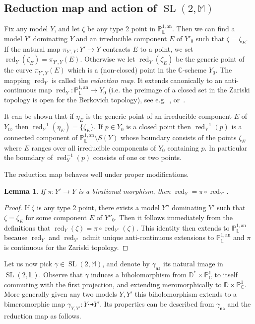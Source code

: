 \documentclass[11pt]{article}
\newtheorem{lemm}[theo]{Lemma}
\theoremstyle{definition}
\numberwithin{equation}{section}
\numberwithin{figure}{section}
\numberwithin{table}{section}
\DeclareMathOperator{\red}{red}
\DeclareMathOperator{\SL}{SL}
\newcommand{\cc}{\mathbb{C}}
\newcommand{\dD}{\mathbb{D}}
\newcommand{\mm}{\mathbb{M}}
\newcommand{\an}{\mathrm{an}}
\newcommand{\PP}{\mathbb{P}}
\newcommand{\berkl}{\mathbb P^{1,\an}_{\Laurent}}
\newcommand{\Laurent}{\mathbb{L}}
\newcommand{\na}{\mathsf{na}}
\begin{document}
\subsection{Reduction map and action of \texorpdfstring{$ \SL(2,\mm)$}{SL(2, mm)}}\label{subs:reduction}

Fix any model $Y$, and let $\zeta$ be any type 2 point in $\PP^{1,\an}_{\Laurent}$. Then we can find a model $Y'$ dominating $Y$ and an irreducible component $E$ of $Y'_0$ such that $\zeta = \zeta_E$. If the natural map $\pi_{Y',Y}: Y' \to Y$ contracts $E$ to a point, we set $\red_Y(\zeta_E) = \pi_{Y',Y}(E)$. Otherwise we let $\red_Y(\zeta_E)$ be the generic point of the curve $\pi_{Y',Y}(E)$ which is a (non-closed) point in the $\cc$-scheme $Y_0$. The mapping $\red_Y$ is called the \emph{reduction map}. It extends canonically to an anti-continuous map $\red_Y: \PP^{1,\an}_{\Laurent}\to Y_0$ (i.e. the preimage of a closed set in the Zariski topology is open for the Berkovich topology), see e.g.~\cite[\S 5.2.4]{temkin}, or~\cite[\S 4.2]{demarco-faber-2}.

It can be shown that if $\eta_E$ is the generic point of an irreducible component $E$ of $Y_0$, then $\red_Y^{-1}(\eta_E) = \{ \zeta_E\}$. If $p\in Y_0$ is a closed point then $\red_Y^{-1}(p)$ is a connected component of $\berkl\setminus {S}(Y)$ whose boundary consists of the points $\zeta_E$ where $E$ ranges over all irreducible components of $Y_0$ containing $p$. In particular the boundary of $\red_Y^{-1}(p)$ consists of one or two points.

The reduction map behaves well under proper modifications.

\begin{lemm}\label{lem:reduction modification}
If $\pi: Y'\to Y$ is a birational morphism, then $\red_Y = \pi\circ \red_{Y'}$.
\end{lemm}

\begin{proof}
If $\zeta$ is any type 2 point, there exists a model $Y''$ dominating $Y'$ such that $\zeta = \zeta_E$ for some component $E$ of $Y''_0$. Then it follows immediately from the definitions that $\red_Y (\zeta)= \pi\circ \red_{Y'}(\zeta)$. This identity then extends to $\berkl$ because $\red_Y$ and $\red_{Y'}$ admit unique anti-continuous extensions to $\berkl$ and $\pi$ is continuous for the Zariski topology.
\end{proof}

Let us now pick $\gamma \in \SL(2, \mm)$, and denote by $\gamma_\na$ its natural image in $\SL(2, \Laurent)$. Observe that $\gamma$ induces a biholomorphism from $\dD^*\times \PP^1_\cc$ to itself commuting with the first projection, and extending meromorphically to $\dD \times \PP^1_\cc$. More generally given any two models $Y,Y'$ this biholomorphism extends to a bimeromorphic map $\gamma_{Y,Y'}: Y \dashrightarrow Y'$. Its properties can be described from $\gamma_\na$ and the reduction map as follows.
\end{document}
